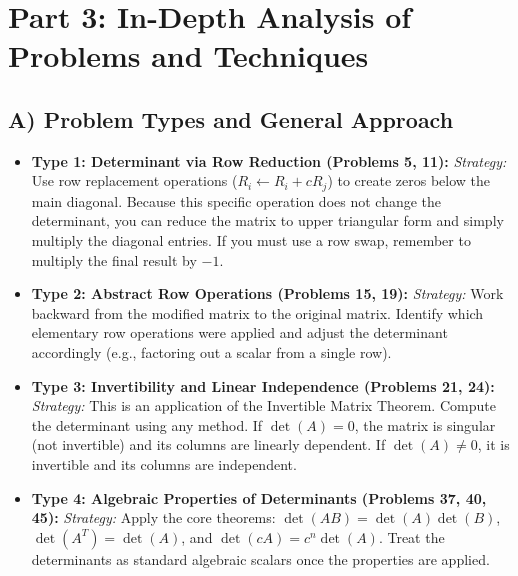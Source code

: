 \documentclass{article}
\begin{document}
\newpage
\section{Part 3: In-Depth Analysis of Problems and Techniques}

\subsection{A) Problem Types and General Approach}
\begin{itemize}
    \item \textbf{Type 1: Determinant via Row Reduction (Problems 5, 11):} 
    \textit{Strategy:} Use row replacement operations ($R_i \leftarrow R_i + cR_j$) to create zeros below the main diagonal. Because this specific operation does not change the determinant, you can reduce the matrix to upper triangular form and simply multiply the diagonal entries. If you must use a row swap, remember to multiply the final result by $-1$.
    \item \textbf{Type 2: Abstract Row Operations (Problems 15, 19):}
    \textit{Strategy:} Work backward from the modified matrix to the original matrix. Identify which elementary row operations were applied and adjust the determinant accordingly (e.g., factoring out a scalar from a single row).
    \item \textbf{Type 3: Invertibility and Linear Independence (Problems 21, 24):}
    \textit{Strategy:} This is an application of the Invertible Matrix Theorem. Compute the determinant using any method. If $\det(A) = 0$, the matrix is singular (not invertible) and its columns are linearly dependent. If $\det(A) \neq 0$, it is invertible and its columns are independent.
    \item \textbf{Type 4: Algebraic Properties of Determinants (Problems 37, 40, 45):}
    \textit{Strategy:} Apply the core theorems: $\det(AB) = \det(A)\det(B)$, $\det(A^T) = \det(A)$, and $\det(cA) = c^n \det(A)$. Treat the determinants as standard algebraic scalars once the properties are applied.
\end{itemize}
\end{document}
